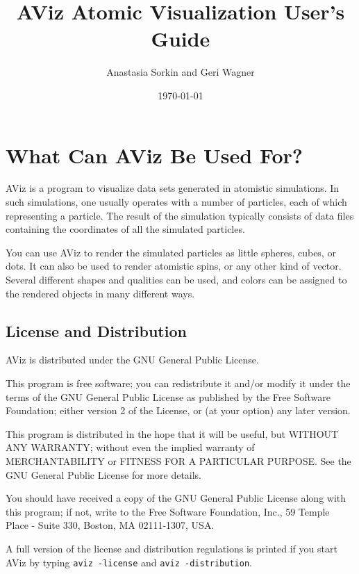 \documentclass[11pt]{article}
\begin{document}
\title{AViz Atomic Visualization User's Guide}

\author{Anastasia Sorkin and Geri Wagner}
\date{\today}
\maketitle

\tableofcontents

\section{What Can AViz Be Used For?}

AViz is a program to visualize data sets generated in atomistic 
simulations.  In such simulations, one usually operates with 
a number of particles, each of which representing a particle.  The 
result of the simulation typically consists of data files containing
the coordinates of all the simulated particles.  

You can use AViz to render the simulated particles as little spheres, cubes, or 
dots.  It can also be used to render atomistic spins, or any other kind of 
vector.    Several different shapes and qualities can be used, and 
colors can be assigned to the rendered objects in many different ways.

\subsection{License and Distribution}

AViz is distributed under the GNU General Public License.  

This program is free software; you can redistribute it and/or
modify it under the terms of the GNU General Public License
as published by the Free Software Foundation; either version 2
of the License, or (at your option) any later version.

This program is distributed in the hope that it will be useful,
but WITHOUT ANY WARRANTY; without even the implied warranty of
MER\-CHANTABI\-LITY or FITNESS FOR A PARTICULAR PURPOSE.  See the
GNU General Public License for more details.

You should have received a copy of the GNU General Public License
along with this program; if not, write to the Free Software
Foundation, Inc., 59 Temple Place - Suite 330, Boston, MA  02111-1307, USA.

A full version of the license and distribution regulations is printed 
if you start AViz by typing {\tt aviz -license} and {\tt aviz -distribution}.
\end{document}
